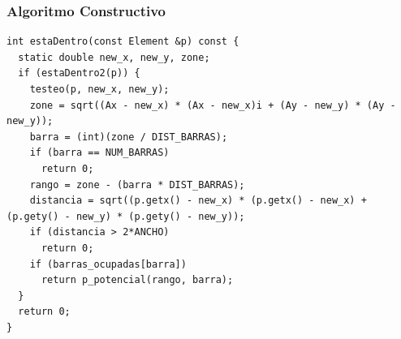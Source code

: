 \begin{frame}[fragile]
    \frametitle{Algoritmo Constructivo}
    \endblock{}
    \begin{lstlisting}[linewidth=\linewidth, numbers=none,basicstyle=\ttfamily\footnotesize]
int estaDentro(const Element &p) const {
  static double new_x, new_y, zone;                            
  if (estaDentro2(p)) {
    testeo(p, new_x, new_y);
    zone = sqrt((Ax - new_x) * (Ax - new_x)i + (Ay - new_y) * (Ay - new_y));
    barra = (int)(zone / DIST_BARRAS);
    if (barra == NUM_BARRAS)
      return 0;
    rango = zone - (barra * DIST_BARRAS);
    distancia = sqrt((p.getx() - new_x) * (p.getx() - new_x) + (p.gety() - new_y) * (p.gety() - new_y));
    if (distancia > 2*ANCHO)
      return 0;
    if (barras_ocupadas[barra])
      return p_potencial(rango, barra);
  }
  return 0;
}
    \end{lstlisting}
\end{frame}

